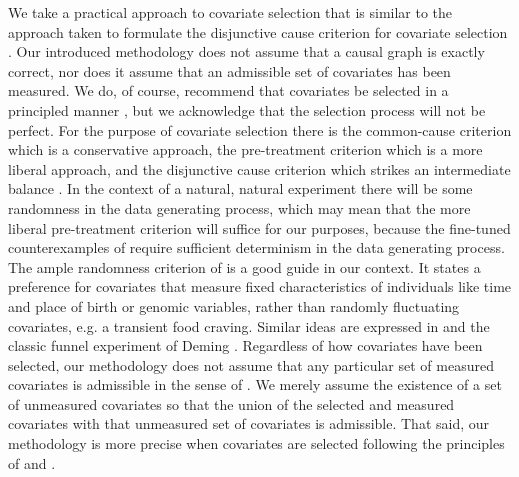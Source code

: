 \documentclass[11pt]{amsart}
\begin{document}
We take a practical approach to covariate selection that is similar to the approach taken to formulate the disjunctive cause criterion for covariate selection \citep{VanderWeele2011}. Our introduced methodology does not assume that a causal graph is exactly correct, nor does it assume that an admissible set of covariates has been measured. We do, of course, recommend that covariates be selected in a principled manner \citep{VandPrinc}, but we acknowledge that the selection process will not be perfect. For the purpose of covariate selection there is the common-cause criterion which is a conservative approach, the pre-treatment criterion which is a more liberal approach, and the disjunctive cause criterion which strikes an intermediate balance \citep{VandPrinc}. In the context of a natural, natural experiment \citep{Rosen} there will be some randomness in the data generating process, which may mean that the more liberal pre-treatment criterion will suffice \citep{DM} for our purposes, because the fine-tuned counterexamples of \citep{PearlDM} require sufficient determinism in the data generating process. The ample randomness criterion of \citep[Section 4.3]{Knaeble2024} is a good guide in our context. It states a preference for covariates that measure fixed characteristics of individuals like time and place of birth or genomic variables, rather than randomly fluctuating covariates, e.g. a transient food craving. Similar ideas are expressed in \citep{Pim} and the classic funnel experiment of Deming \citep{Deming}. Regardless of how covariates have been selected, our methodology does not assume that any particular set of measured covariates is admissible in the sense of \citep{Pearl2009}. We merely assume the existence of a set of unmeasured covariates so that the union of the selected and measured covariates with that unmeasured set of covariates is admissible. That said, our methodology is more precise when covariates are selected following the principles of \citep{VandPrinc} and \citep[Section 4.3]{Knaeble2024}.
%
\end{document}
